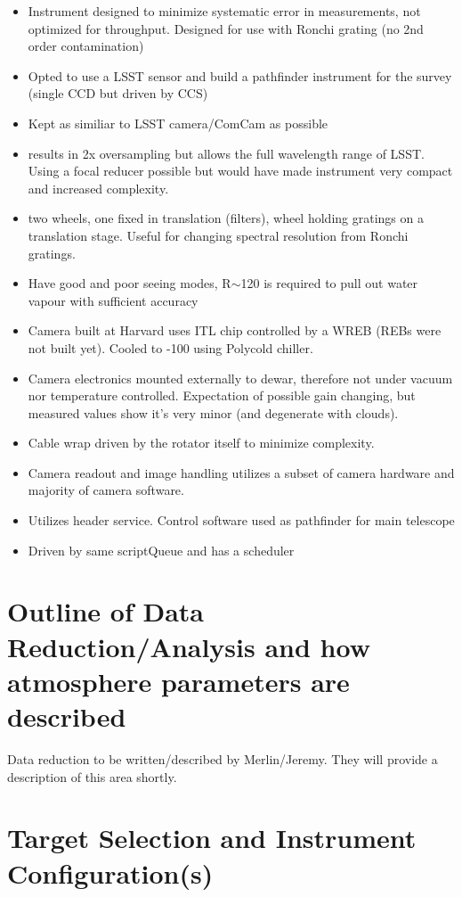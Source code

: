 \begin{itemize}
	\item Instrument designed to minimize systematic error in measurements, not optimized for throughput. Designed for use with Ronchi grating (no 2nd order contamination)
	\item Opted to use a LSST sensor and build a pathfinder instrument for the survey (single CCD but driven by CCS)
	\item Kept as similiar to LSST camera/ComCam as possible
	\item results in 2x oversampling but allows the full wavelength range of LSST. Using a focal reducer possible but would have made instrument very compact and increased complexity.
	\item two wheels, one fixed in translation (filters), wheel holding gratings on a translation stage. Useful for changing spectral resolution from Ronchi gratings.
	\item Have good and poor seeing modes, R$\sim$120 is required to pull out water vapour with sufficient accuracy
	\item Camera built at Harvard uses ITL chip controlled by a WREB (REBs were not built yet). Cooled to -100 using Polycold chiller.
	\item Camera electronics mounted externally to dewar, therefore not under vacuum nor temperature controlled. Expectation of possible gain changing, but measured values show it's very minor (and degenerate with clouds).
	\item Cable wrap driven by the rotator itself to minimize complexity.
	\item Camera readout and image handling utilizes a subset of camera hardware and majority of camera software.
	\item Utilizes header service. Control software used as pathfinder for main telescope \citep{PSTN-007}
	\item Driven by same scriptQueue and has a scheduler
\end{itemize}

\section{Outline of Data Reduction/Analysis and how atmosphere parameters are described} 

Data reduction to be written/described by Merlin/Jeremy. They will provide a description of this area shortly.

\section{Target Selection and Instrument Configuration(s)}
\label{sec:targets}

